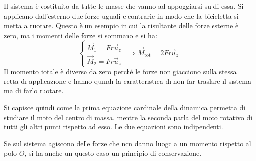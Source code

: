 \documentclass[10pt,a4paper]{book}
\begin{document}
\FloatBarrier
Il sistema è costituito da tutte le masse che vanno ad appoggiarsi su di essa.  Si applicano dall'esterno due forze uguali e contrarie in modo che la bicicletta si metta a ruotare. Questo è un esempio in cui la risultante delle forze esterne è zero, ma i momenti delle forze si sommano e si ha:
\[
	\begin{cases} \vec{M}_1=Fr\vec{u}_z \\ \vec{M}_2=Fr\vec{u}_z \end{cases} \implies \vec{M}_\text{tot}=2Fr\vec{u}_z
\]
Il momento totale è diverso da zero perché le forze non giacciono sulla stessa retta di applicazione e hanno quindi la caratteristica di non far traslare il sistema ma di farlo ruotare.

Si capisce quindi come la prima equazione cardinale della dinamica permetta di studiare il moto del centro di massa, mentre la seconda parla del moto rotativo di tutti gli altri punti rispetto ad esso. Le due equazioni sono indipendenti.

Se sul sistema agiscono delle forze che non danno luogo a un momento rispetto al polo $O$, si ha anche un questo caso un principio di conservazione.
\end{document}
